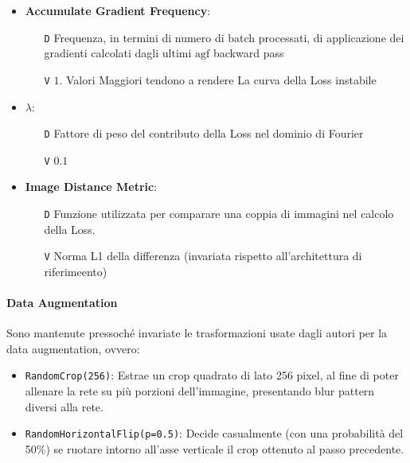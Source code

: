 \documentclass[a4paper,10pt,twocolumn]{article}
\begin{document}
\begin{itemize}[topsep=5pt, itemsep=7pt]
  \item
    \textbf{Accumulate Gradient Frequency}:
    \begin{itemize}[topsep=0pt, noitemsep]
      \item[\texttt{D}] Frequenza, in termini di numero di batch processati, di applicazione dei gradienti calcolati dagli ultimi
        $\mathrm{agf}$ backward pass
      \item[\texttt{V}] $1$. Valori Maggiori tendono a rendere La curva della Loss instabile
    \end{itemize}

  \item
    \textbf{$\lambda$}:
    \begin{itemize}[topsep=0pt, noitemsep]
      \item[\texttt{D}] Fattore di peso del contributo della Loss nel dominio di Fourier
      \item[\texttt{V}] $0.1$
    \end{itemize}

  \item
    \textbf{Image Distance Metric}:
    \begin{itemize}[topsep=0pt, noitemsep]
      \item[\texttt{D}] Funzione utilizzata per comparare una coppia di immagini nel calcolo della Loss.
      \item[\texttt{V}] Norma L1 della differenza (invariata rispetto all'architettura di riferimeento)
    \end{itemize}
\end{itemize}

\paragraph{Data Augmentation}

Sono mantenute pressoché invariate le trasformazioni usate dagli autori per la data augmentation, ovvero:
\begin{itemize}
  \item \texttt{RandomCrop(256)}: Estrae un crop quadrato di lato 256 pixel, al fine di poter allenare la rete su pi\`u porzioni dell'immagine, presentando
  blur pattern diversi alla rete.
  \item \texttt{RandomHorizontalFlip(p=0.5)}: Decide casualmente (con una probabilità del 50\%) se ruotare intorno all'asse verticale il crop ottenuto al passo precedente.
\end{itemize}
\end{document}
